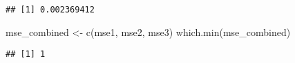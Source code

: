 \documentclass[
]{article}
\newenvironment{Shaded}{\begin{snugshade}}{\end{snugshade}}
\newcommand{\FunctionTok}[1]{\textcolor[rgb]{0.00,0.00,0.00}{#1}}
\newcommand{\NormalTok}[1]{#1}
\newcommand{\OtherTok}[1]{\textcolor[rgb]{0.56,0.35,0.01}{#1}}
\begin{document}
\begin{verbatim}
## [1] 0.002369412
\end{verbatim}

\begin{Shaded}
\begin{Highlighting}[]
\NormalTok{mse\_combined }\OtherTok{\textless{}{-}} \FunctionTok{c}\NormalTok{(mse1, mse2, mse3)}
\FunctionTok{which.min}\NormalTok{(mse\_combined)}
\end{Highlighting}
\end{Shaded}

\begin{verbatim}
## [1] 1
\end{verbatim}
\end{document}

